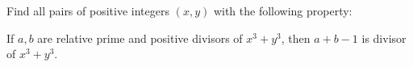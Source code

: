 Find all pairs of positive integers $(x,y)$ with the following property:

If $a,b$ are relative prime and positive divisors of   $ x^3 + y^3$,  then  $a+b - 1$ is divisor of $x^3+y^3$.

